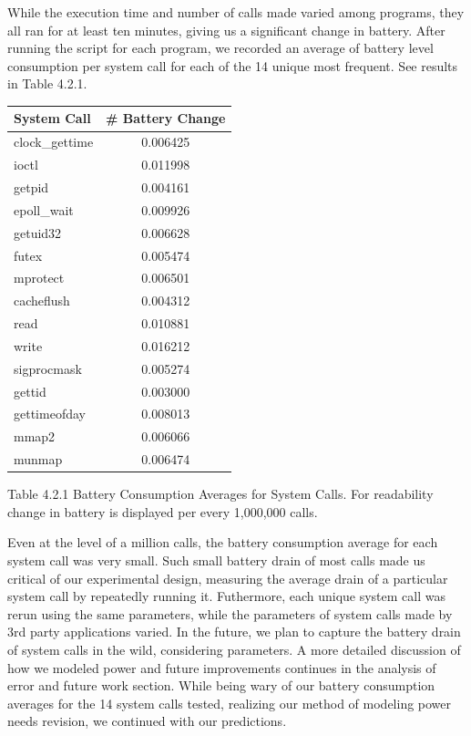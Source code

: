 \documentclass[11pt]{article}
\begin{document}
While the execution time and number of calls made varied among programs, they all ran for at least ten minutes, giving
us a significant change in battery. After running the script for each program, we recorded an average of battery level 
consumption per system call for each of the 14 unique most frequent.  See results in Table 4.2.1.

\begin{tabular}{l c}
   System Call & \# Battery Change \\
   \hline
   clock\_gettime & 0.006425 \\
   ioctl & 0.011998 \\
   getpid & 0.004161 \\
   epoll\_wait & 0.009926 \\      
   getuid32 & 0.006628 \\
   futex & 0.005474 \\
   mprotect & 0.006501 \\
   cacheflush & 0.004312 \\
   read & 0.010881 \\         
   write &  0.016212 \\        
   sigprocmask & 0.005274 \\
   gettid & 0.003000 \\
   gettimeofday & 0.008013 \\
   mmap2 & 0.006066 \\
   munmap &  0.006474\\              
\end{tabular}
\newline
{\fontsize{11}{13}\selectfont Table 4.2.1 Battery Consumption Averages for System Calls. For readability change in battery is displayed
per every 1,000,000 calls.}
\newline

Even at the level of a million calls, the battery consumption average for each system call was very small.  Such small battery drain of 
most calls made us critical of our experimental design, measuring the average drain of a particular system call by repeatedly running it.  
Futhermore, each unique system call was rerun using the same parameters, while the parameters of system calls made by 3rd party 
applications varied.  In the future, we plan to capture the battery drain of system calls in the wild, considering parameters.  A more detailed 
discussion of how we modeled power and future improvements continues in the analysis of error and future work section.  While being wary 
of our battery consumption averages for the 14 system calls tested, realizing our method of modeling power needs revision, we continued with our predictions.
\end{document}
